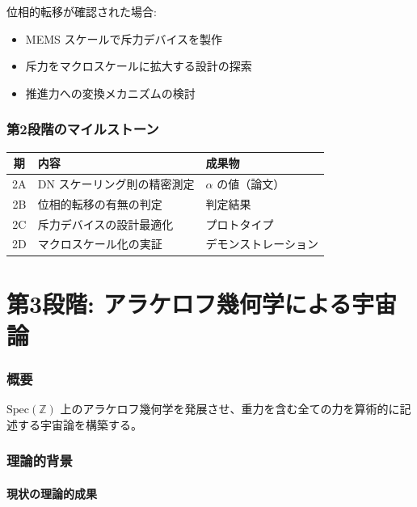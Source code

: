 \documentclass[11pt,a4paper]{article}
\begin{document}
位相的転移が確認された場合:
\begin{itemize}
\item MEMS スケールで斥力デバイスを製作
\item 斥力をマクロスケールに拡大する設計の探索
\item 推進力への変換メカニズムの検討
\end{itemize}

\section{第2段階のマイルストーン}

\begin{center}
\renewcommand{\arraystretch}{1.3}
\begin{tabular}{cll}
\toprule
期 & 内容 & 成果物 \\
\midrule
2A & DN スケーリング則の精密測定 & $\alpha$ の値（論文） \\
2B & 位相的転移の有無の判定 & 判定結果 \\
2C & 斥力デバイスの設計最適化 & プロトタイプ \\
2D & マクロスケール化の実証 & デモンストレーション \\
\bottomrule
\end{tabular}
\end{center}

\part{第3段階: アラケロフ幾何学による宇宙論}

\section{概要}

\begin{planbox}[第3段階の目標]
$\mathrm{Spec}(\mathbb{Z})$ 上のアラケロフ幾何学を発展させ、重力を含む全ての力を算術的に記述する宇宙論を構築する。
\end{planbox}

\section{理論的背景}

\subsection{現状の理論的成果}
\end{document}
